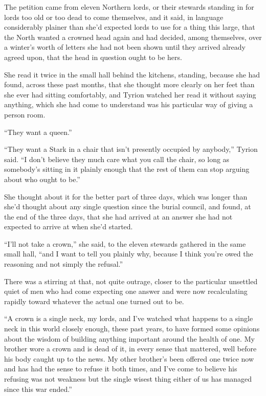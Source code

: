 The petition came from eleven Northern lords, or their stewards standing in for lords too old or too dead to come themselves, and it said, in language considerably plainer than she’d expected lords to use for a thing this large, that the North wanted a crowned head again and had decided, among themselves, over a winter’s worth of letters she had not been shown until they arrived already agreed upon, that the head in question ought to be hers.

She read it twice in the small hall behind the kitchens, standing, because she had found, across these past months, that she thought more clearly on her feet than she ever had sitting comfortably, and Tyrion watched her read it without saying anything, which she had come to understand was his particular way of giving a person room.

“They want a queen.”

“They want a Stark in a chair that isn’t presently occupied by anybody,” Tyrion said. “I don’t believe they much care what you call the chair, so long as somebody’s sitting in it plainly enough that the rest of them can stop arguing about who ought to be.”

\sceneBreak

She thought about it for the better part of three days, which was longer than she’d thought about any single question since the burial council, and found, at the end of the three days, that she had arrived at an answer she had not expected to arrive at when she’d started.

“I’ll not take a crown,” she said, to the eleven stewards gathered in the same small hall, “and I want to tell you plainly why, because I think you’re owed the reasoning and not simply the refusal.”

There was a stirring at that, not quite outrage, closer to the particular unsettled quiet of men who had come expecting one answer and were now recalculating rapidly toward whatever the actual one turned out to be.

“A crown is a single neck, my lords, and I’ve watched what happens to a single neck in this world closely enough, these past years, to have formed some opinions about the wisdom of building anything important around the health of one. My brother wore a crown and is dead of it, in every sense that mattered, well before his body caught up to the news. My other brother’s been offered one twice now and has had the sense to refuse it both times, and I’ve come to believe his refusing was not weakness but the single wisest thing either of us has managed since this war ended.”

